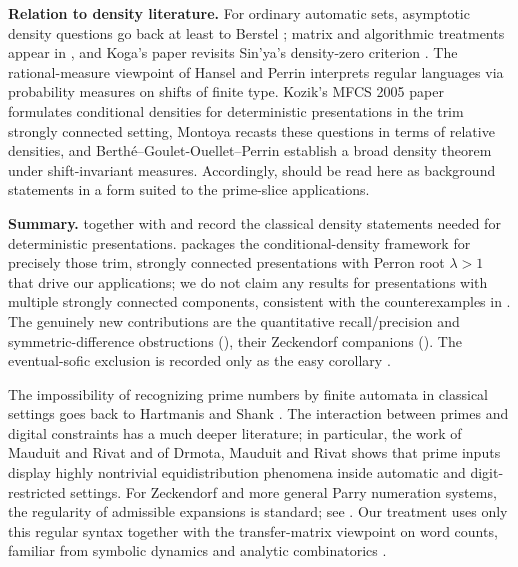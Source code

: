 \smallskip
\noindent\textbf{Relation to density literature.} For ordinary
automatic sets, asymptotic density questions go back at least to
Berstel \cite{Berstel1973}; matrix and algorithmic treatments appear in
\cite{BodirskyGaertnerVonOertzenSchwinghammer2004,Bell2020UpperDensity},
and Koga's paper \cite{Koga2019Density} revisits Sin'ya's density-zero
criterion \cite{Sinya2021}. The rational-measure viewpoint of Hansel
and Perrin \cite{HanselPerrin1989} interprets regular languages via
probability measures on shifts of finite type. Kozik's MFCS 2005 paper
\cite{Kozik2005Conditional} formulates conditional densities for
deterministic presentations in the trim strongly connected setting,
Montoya \cite{Montoya2025Relative} recasts these questions in terms of
relative densities, and Berth\'e--Goulet-Ouellet--Perrin
\cite{BertheGouletPerrin2025} establish a broad density theorem under
shift-invariant measures. Accordingly,
should be read here as background statements in a form suited to the
prime-slice applications.


\medskip
\noindent\textbf{Summary.}  together with
 and 
record the classical density statements needed for deterministic
presentations.  packages the conditional-density
framework for precisely those trim, strongly connected presentations
with Perron root \(\lambda>1\) that drive our applications; we do not
claim any results for presentations with multiple strongly connected
components, consistent with the counterexamples in
\cite{CharlierRampersadRigoWaxweiler2010}. The genuinely new
contributions are the quantitative recall/precision and symmetric-difference
obstructions (),
their Zeckendorf companions
(). The
eventual-sofic exclusion is recorded only as the easy corollary
.

\medskip
The impossibility of recognizing prime numbers by finite automata in
classical settings goes back to Hartmanis and Shank
\cite{HartmanisShank1968}. The interaction between primes and digital
constraints has a much deeper literature; in particular, the work of
Mauduit and Rivat \cite{MauduitRivat2010} and of Drmota, Mauduit and
Rivat \cite{DrmotaMauduitRivat2009} shows that prime inputs display
highly nontrivial equidistribution phenomena inside automatic and
digit-restricted settings. For Zeckendorf and more general Parry
numeration systems, the regularity of admissible expansions is standard;
see \cite{Frougny1992,BruyereHansel1997}. Our treatment uses only this
regular syntax together with the transfer-matrix viewpoint on word
counts, familiar from symbolic dynamics and analytic combinatorics
\cite{LindMarcus1995,Kitchens1998,FlajoletSedgewick2009}.

